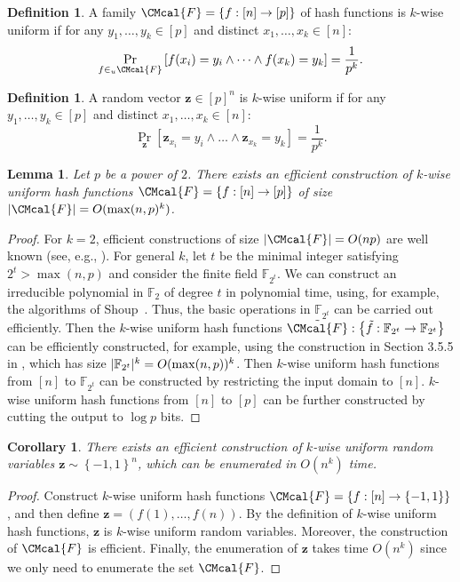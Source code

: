 \documentclass[11pt]{article}
\def\F{\CMcal{F}}
\theoremstyle{plain}
\newtheorem{lemma}[theorem]{Lemma}
\newtheorem{cor}[theorem]{Corollary}
\theoremstyle{definition}
\newtheorem{definition}[theorem]{Definition}
\newcommand {\set} [1] {\ensuremath{ \left\lbrace #1 \right\rbrace }}
\newcommand {\Br} [1] {\ensuremath{ \left[ #1 \right] }}
\DeclarePairedDelimiter{\abs}{\lvert}{\rvert}
\newcommand{\randz}{\ensuremath{\mathbf{z}}}
\newcommand{\1}{\mathbb{1}} %
\begin{document}
\begin{definition}
A family $\F=\set{f:[n]\to[p]}$ of hash functions is $k$-wise uniform if for any $y_1, \dots, y_k\in[p]$ and distinct $x_1, \dots, x_k\in[n]$:
\[\Pr_{f\in_u\F}\Br{f(x_i)=y_i\wedge\dots\wedge f(x_k)=y_k}=\frac{1}{p^k}.\]
\end{definition}
\begin{definition}
A random vector $\randz\in[p]^n$ is $k$-wise uniform if for any $y_1,\dots,y_k\in[p]$ and distinct $x_1,\dots,x_k\in[n]$:
\[\Pr_{\randz}\Br{\randz_{x_i}=y_i\wedge\dots\wedge \randz_{x_k}=y_k}=\frac{1}{p^k}.\]
\end{definition}

\begin{lemma}\label{lem:kwise-hash}
  Let $p$ be a power of $2$.
  There exists an efficient construction of $k$-wise uniform hash functions $\F=\set{f: [n]\to[p]}$ of size $\abs{\F}=O(\max(n, p)^k)$.
\end{lemma}
\begin{proof}
  For $k=2$, efficient constructions of size $\abs{\F}=O(np)$ are well known (see, e.g., \cite{10.1145/800105.803400}).
  For general $k$,
let $t$ be the minimal integer satisfying $2^t>\max(n, p)$ and consider the finite field $\mathbb{F}_{2^t}$.
  We can construct an irreducible polynomial in $\mathbb{F}_2$ of degree $t$ in polynomial time,
using, for example, the algorithms of Shoup~\cite{shoup1990new}.
  Thus, the basic operations in $\mathbb{F}_{2^t}$ can be carried out efficiently.
  Then the $k$-wise uniform hash functions $\tilde{\F}: \set{\tilde{f}: \mathbb{F}_{2^t}\to\mathbb{F}_{2^t}}$ can be efficiently constructed,
for example, using the construction in Section 3.5.5 in \cite{TCS-010},
  which has size $\abs{\mathbb{F}_{2^t}}^k=O(\max(n, p))^k$.
  Then $k$-wise uniform hash functions from $[n]$ to $\mathbb{F}_{2^t}$ can be constructed by restricting the input domain to $[n]$.
  $k$-wise uniform hash functions from $[n]$ to $[p]$ can be further constructed by cutting the output to $\log p$ bits.
\end{proof}
\begin{cor}\label{cor:kwise-z}
  There exists an efficient construction of $k$-wise uniform random variables $\randz\sim\set{-1,1}^n$,
which can be enumerated in $O(n^k)$ time.
\end{cor}
\begin{proof}
  Construct $k$-wise uniform hash functions $\F=\set{f: [n]\to\set{-1,1}}$, and then define $\randz=(f(1), \dots, f(n))$.
  By the definition of $k$-wise uniform hash functions,
  $\randz$ is $k$-wise uniform random variables.
  Moreover, the construction of $\F$ is efficient.
  Finally, the enumeration of $\randz$ takes time $O(n^k)$
  since we only need to enumerate the set $\F$.
\end{proof}
\end{document}
